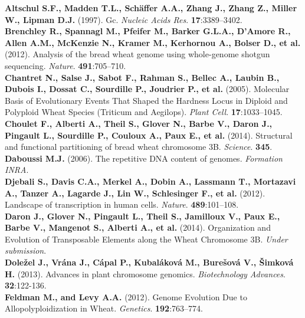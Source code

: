 \documentclass[a4paper, 12pt]{article}
\begin{document}
\begin{onehalfspace}
\begin{flushleft}
\textbf{Altschul S.F., Madden T.L., Schäffer A.A., Zhang J., Zhang Z., Miller W., Lipman D.J.} (1997). Gc. \textit{Nucleic Acids Res}. \textbf{17}:3389–3402.\\
\vspace{0.3cm}
\textbf{Brenchley R., Spannagl M., Pfeifer M., Barker G.L.A., D’Amore R., Allen A.M., McKenzie N., Kramer M., Kerhornou A., Bolser D., et al.} (2012). Analysis of the bread wheat genome using whole-genome shotgun sequencing. \textit{Nature}. \textbf{491}:705–710.\\
\vspace{0.3cm}
\textbf{Chantret N., Salse J., Sabot F., Rahman S., Bellec A., Laubin B., Dubois I., Dossat C., Sourdille P., Joudrier P., et al.} (2005). Molecular Basis of Evolutionary Events That Shaped the Hardness Locus in Diploid and Polyploid Wheat Species (Triticum and Aegilops). \textit{Plant Cell}. \textbf{17}:1033–1045.\\
\vspace{0.3cm}
\textbf{Choulet F., Alberti A., Theil S., Glover N., Barbe V., Daron J., Pingault L., Sourdille P., Couloux A., Paux E., et al.} (2014). Structural and functional partitioning of bread wheat chromosome 3B. \textit{Science}. \textbf{345}.\\
\vspace{0.3cm}
\textbf{Daboussi M.J.} (2006). The repetitive DNA content of genomes. \textit{Formation INRA}.\\
\vspace{0.3cm}
\textbf{Djebali S., Davis C.A., Merkel A., Dobin A., Lassmann T., Mortazavi A., Tanzer A., Lagarde J., Lin W., Schlesinger F., et al.} (2012). Landscape of transcription in human cells. \textit{Nature}. \textbf{489}:101–108.\\
\vspace{0.3cm}
\textbf{Daron J., Glover N., Pingault L., Theil S., Jamilloux V., Paux E., Barbe V., Mangenot S., Alberti A., et al.} (2014). Organization and Evolution of Transposable Elements along the Wheat Chromosome 3B. \textit{Under submission}.\\
\vspace{0.3cm}
\textbf{Doležel J., Vrána J., Cápal P., Kubaláková M., Burešová V., Šimková H.} (2013). Advances in plant chromosome genomics. \textit{Biotechnology Advances}. \textbf{32}:122-136.\\
\vspace{0.3cm}
\textbf{Feldman M., and Levy A.A.} (2012). Genome Evolution Due to Allopolyploidization in Wheat. \textit{Genetics}. \textbf{192}:763–774.\\

\end{flushleft}
\end{onehalfspace}
\end{document}
